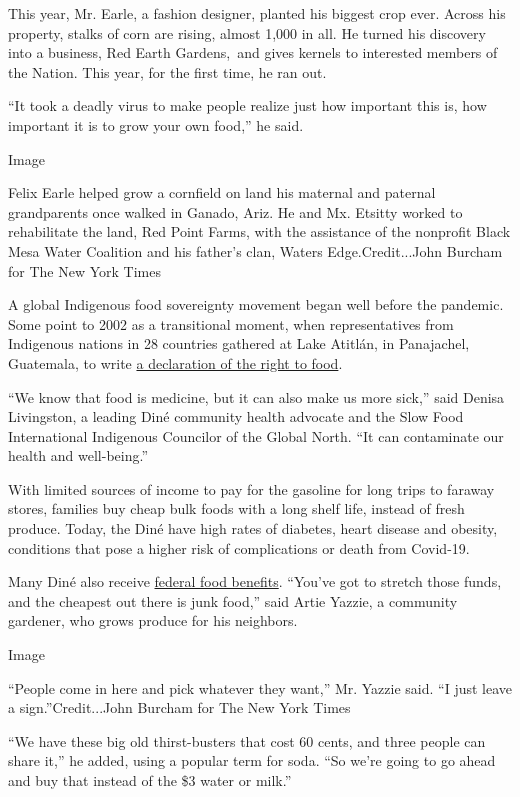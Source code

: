This year, Mr. Earle, a fashion designer, planted his biggest crop ever.
Across his property, stalks of corn are rising, almost 1,000 in all. He
turned his discovery into a business, Red Earth Gardens,~and gives
kernels to interested members of the Nation. This year, for the first
time, he ran out.

``It took a deadly virus to make people realize just how important this
is, how important it is to grow your own food,'' he said.

Image

Felix Earle helped grow a cornfield on land his maternal and paternal
grandparents once walked in Ganado, Ariz. He and Mx. Etsitty worked to
rehabilitate the land, Red Point Farms, with the assistance of the
nonprofit Black Mesa Water Coalition and his father's clan, Waters
Edge.Credit...John Burcham for The New York Times

A global Indigenous food sovereignty movement began well before the
pandemic. Some point to 2002 as a transitional moment, when
representatives from Indigenous nations in 28 countries gathered at Lake
Atitlán, in Panajachel, Guatemala, to write
\href{https://www.iitc.org/wp-content/uploads/2013/07/FINAL_Atitlan-Declaration-Food-Security_Apr25_ENGL.pdf}{a
declaration of the right to food}.

``We know that food is medicine, but it can also make us more sick,''
said Denisa Livingston, a leading Diné community health advocate and the
Slow Food International Indigenous Councilor of the Global North. ``It
can contaminate our health and well-being.''

With limited sources of income to pay for the gasoline for long trips to
faraway stores, families buy cheap bulk foods with a long shelf life,
instead of fresh produce. Today, the Diné have high rates of diabetes,
heart disease and obesity, conditions that pose a higher risk of
complications or death from Covid-19.

Many Diné also receive
\href{https://gardenwarriorsgoodseeds.com/2020/05/03/native-food-systems-in-the-time-of-covid-19/}{federal
food benefits}. ``You've got to stretch those funds, and the cheapest
out there is junk food,'' said Artie Yazzie, a community gardener, who
grows produce for his neighbors.

Image

``People come in here and pick whatever they want,'' Mr. Yazzie said.
``I just leave a sign.''Credit...John Burcham for The New York Times

``We have these big old thirst-busters that cost 60 cents, and three
people can share it,'' he added, using a popular term for soda. ``So
we're going to go ahead and buy that instead of the \$3 water or milk.''

